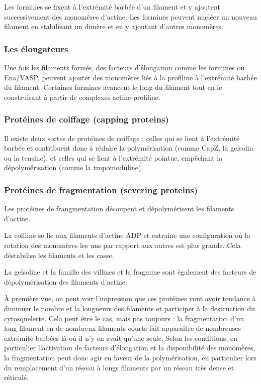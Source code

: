 Les formines se fixent à l'extrémité barbée d'un filament et y ajoutent successivement des monomères d'actine. Les formines peuvent nucléer un nouveau filament en stabilisant un dimère et en y ajoutant d'autres monomères. 

\subsubsection{Les élongateurs}

Une fois les filaments formés, des facteurs d'élongation comme les formines ou Ena/VASP, peuvent ajouter des monomères liés à la profiline à l'extrémité barbée du filament. 
Certaines formines avancent le long du filament tout en le construisant à partir de complexes actine-profiline. 


\subsubsection{Protéines de coiffage (capping proteins)}

Il existe deux sortes de protéines de coiffage : celles qui se lient à l'extrémité barbée et contribuent donc à réduire la polymérisation (comme CapZ, la gelsolin ou la tensine), et celles qui se lient à l'extrémité pointue, empêchant la dépolymérisation (comme la tropomoduline). 


\subsubsection{Protéines de fragmentation (severing proteins)}
Les protéines de frangmentation découpent et dépolymérisent les filaments d'actine. 

La cofiline se lie aux filaments d'actine ADP et entraîne une configuration où la rotation des monomères les uns par rapport aux autres est plus grande. Cela déstabilise les filaments et les casse. 

La gelsoline et la famille des villines et la fragmine sont également des facteurs de dépolymérisation des filaments d'actine. 

À première vue, on peut voir l'impression que ces protéines vont avoir tendance à diminuer le nombre et la longueurs des filaments et participer à la destruction du cytosquelette. Cela peut être le cas, mais pas toujours : la fragmentation d'un long filament en de nombreux filaments courts fait apparaître de nombreuses extrémité barbées là où il n'y en avait qu'une seule. Selon les conditions, en particulier l'activation de facteurs d'élongation et la disponibilité des monomères, la fragmentation peut donc agir en faveur de la polymérisation, en particulier lors du remplacement d'un réseau à longs filaments par un réseau très dense et réticulé. 

